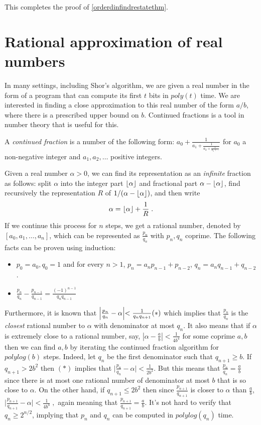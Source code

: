 This completes the proof of \cref{orderdinfindrestatethm}.

\section{Rational approximation of real
numbers}\label{Rational-approximation-of-real}

In many settings, including Shor's algorithm, we are given a real number
in the form of a program that can compute its first \(t\) bits in
\(poly(t)\) time. We are interested in finding a close approximation to
this real number of the form \(a/b\), where there is a prescribed upper
bound on \(b\). Continued fractions is a tool in number theory that is
useful for this.

A \emph{continued fraction} is a number of the following form:
\(a_0 + \frac{1}{a_1 + \frac{1}{a_2 + \tfrac{1}{a_3 + \ldots}} }\) for
\(a_0\) a non-negative integer and \(a_1,a_2,\ldots\) positive integers.

Given a real number \(\alpha>0\), we can find its representation as an
\emph{infinite} fraction as follows: split \(\alpha\) into the integer
part \(\lfloor \alpha \rfloor\) and fractional part \(\alpha - \lfloor \alpha \rfloor\),
find recursively the representation \(R\) of
\(1/(\alpha - \lfloor \alpha \rfloor)\), and then write
\[\alpha = \lfloor \alpha \rfloor + \frac{1}{R} \;.\] If we continue this
process for \(n\) steps, we get a rational number, denoted by
\([a_0,a_1,\ldots,a_n]\), which can be represented as
\(\tfrac{p_n}{q_n}\) with \(p_n,q_n\) coprime. The following facts can
be proven using induction:

\begin{itemize}
\item
  \(p_0=a_0, q_0 =1\) and for every \(n>1\),
  \(p_n = a_np_{n-1} + p_{n-2}\), \(q_n = a_nq_{n-1} + q_{n-2}\).
\item
  \(\tfrac{p_n}{q_n} - \tfrac{p_{n-1}}{q_{n-1}} = \tfrac{(-1)^{n-1}}{q_nq_{n-1}}\)
\end{itemize}

Furthermore, it is known that
\(\Bigl|\tfrac{p_n}{q_n} - \alpha\Bigl| < \tfrac{1}{q_nq_{n+1}} (*)\)
which implies that \(\tfrac{p_n}{q_n}\) is the \emph{closest} rational
number to \(\alpha\) with denominator at most \(q_n\). It also means
that if \(\alpha\) is extremely close to a rational number, say,
\(\left|\alpha - \tfrac{a}{b} \right| < \tfrac{1}{4b^4}\) for some
coprime \(a,b\) then we can find \(a,b\) by iterating the continued
fraction algorithm for \(polylog(b)\) steps. Indeed, let \(q_n\) be the
first denominator such that \(q_{n+1} \geq b\). If \(q_{n+1} > 2b^2\)
then \((*)\) implies that
\(\bigl|\tfrac{p_n}{q_n}-\alpha\bigr| < \tfrac{1}{2b^2}\). But this
means that \(\tfrac{p_n}{q_n} = \tfrac{a}{b}\) since there is at most
one rational number of denominator at most \(b\) that is so close to
\(\alpha\). On the other hand, if \(q_{n+1} \leq 2b^2\) then since
\(\tfrac{p_{n+1}}{q_{n+1}}\) is closer to \(\alpha\) than
\(\tfrac{a}{b}\),
\(\bigl|\tfrac{p_{n+1}}{q_{n+1}}-\alpha\bigr| < \tfrac{1}{4b^4}\;,\)
again meaning that \(\tfrac{p_{n+1}}{q_{n+1}}=\tfrac{a}{b}\). It's not
hard to verify that \(q_n \geq 2^{n/2}\), implying that \(p_n\) and
\(q_n\) can be computed in \(polylog(q_n)\) time.

